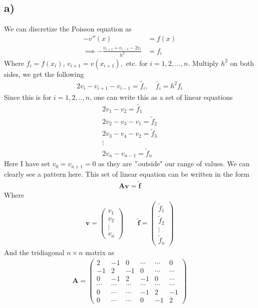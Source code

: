 \documentclass[12pt]{article}
\begin{document}
\subsection*{a)}
We can discretize the Poisson equation as
\begin{align}
-v''(x) &= f(x)\\ \nonumber
\implies -\frac{v_{i+1} + v_{i-1} - 2v_i}{h^2} &= f_i
\end{align}
Where $f_i = f(x_i)$, $v_{i+1}=v(x_{i+1}),$ etc. for $i=1,2,...,n$. Multiply $h^2$ on both sides, we get the following
\begin{align}
2v_i - v_{i+1} - v_{i-1} = \tilde{f_i}, \quad \tilde{f_i} = h^2f_i
\end{align}
Since this is for $i = 1,2,..,n$, one can write this as a set of linear equations
\begin{align}
2v_1 - v_2 = \tilde{f_1} \nonumber \\ 
2v_2 - v_3 - v_1 = \tilde{f}_2 \nonumber \\
2v_3 - v_4 - v_2 = \tilde{f}_3 \nonumber \\
\vdots \nonumber \\
2v_n - v_{n-1} = \tilde{f}_n
\end{align}
Here I have set $v_0 = v_{n+1} = 0$ as they are $"$outside" our range of values. We can clearly see a pattern here. This set of linear equation can be written in the form
\begin{align}
\mathbf{A}\mathbf{v} = \mathbf{\tilde{f}}
\end{align}
Where
\begin{align}
\mathbf{v} = 
\begin{pmatrix}
v_1 \\
v_2 \\
\vdots \\
v_n
\end{pmatrix}
\qquad
\mathbf{\tilde{f}} =
\begin{pmatrix}
\tilde{f}_1\\
\tilde{f}_2\\
\vdots \\
\tilde{f}_n
\end{pmatrix}
\end{align}
And the tridiagonal $n \times n$ matrix as
\begin{align}
\mathbf{A} =
\begin{pmatrix}
2 & -1 & 0 & \cdots & \cdots & 0 \\
-1 & 2 & -1 & 0 & \cdots & \cdots \\
0 & -1 & 2 & -1 & 0 & \cdots \\
\cdots & \cdots & \cdots & \cdots & \cdots & \cdots \\
0 & \cdots & \cdots & -1 & 2 & -1 \\
0 & \cdots & \cdots & 0 & -1 & 2
\end{pmatrix}
\end{align}
\end{document}
